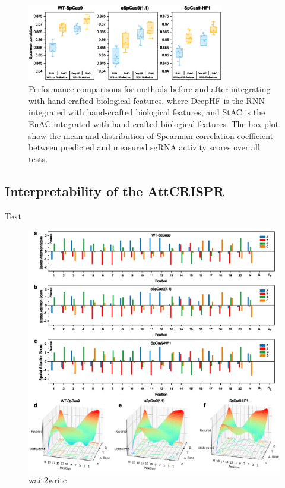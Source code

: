 \documentclass{bioinfo}
\begin{document}
\begin{figure}[!tpb]%
    \centerline{\includegraphics[width=86mm]{baselinewithbiofeat.eps}}
    \caption{
Performance comparisons for methods before and after integrating with hand-crafted biological features, 
where DeepHF is the RNN integrated with hand-crafted biological features, 
and StAC is the EnAC integrated with hand-crafted biological features. 
The box plot show the mean and distribution of Spearman correlation coefficient between predicted and measured sgRNA activity scores over all tests.
}\label{fig:07}
\end{figure}

\subsection{Interpretability of the AttCRISPR}\label{section:interpretability}

Text
\begin{figure}[!tpb]%
    \centerline{\includegraphics[width=178mm]{spatialattention.eps}}
    \caption{
        wait2write
    }\label{fig:06}
\end{figure}
\end{document}
